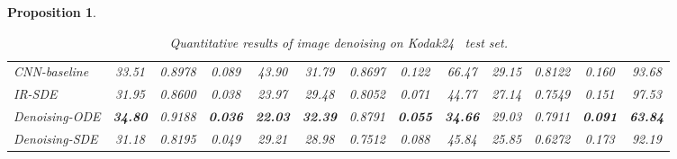 \documentclass{article}
\theoremstyle{plain}
\newtheorem{proposition}[theorem]{Proposition}
\theoremstyle{definition}
\theoremstyle{remark}
\begin{document}
\begin{proposition}
\begin{table}[ht]
\begin{minipage}[h]{1.\linewidth}
\begin{center}
\begin{small}
\begin{sc}
{\begin{tabular}{lcccccccccccc}
CNN-baseline  & 33.51 & 0.8978 & 0.089 & 43.90 & 31.79 & 0.8697 & 0.122 & 66.47 & 29.15 & 0.8122 & 0.160 & 93.68 \\

IR-SDE & 31.95 & 0.8600 & 0.038 & 23.97 & 29.48 & 0.8052 & 0.071 & 44.77 & 27.14 & 0.7549 & 0.151 & 97.53 \\

Denoising-ODE  & \textbf{34.80} & 0.9188 & \textbf{0.036} & \textbf{22.03} & \textbf{32.39} & 0.8791 & \textbf{0.055} & \textbf{34.66} & 29.03 & 0.7911 & \textbf{0.091} & \textbf{63.84} \\
Denoising-SDE  & 31.18 & 0.8195 & 0.049 & 29.21 & 28.98 & 0.7512 & 0.088 & 45.84 & 25.85 & 0.6272 & 0.173 & 92.19 \\


\bottomrule
\end{tabular}
}
\end{sc}
\end{small}
\end{center}
\vskip -0.1in
\end{minipage}

\begin{minipage}[h]{1.\linewidth}
\caption{Quantitative results of image denoising on Kodak24~\cite{franzen1999kodak} test set.}
\label{app-table:denoising_kodak24}
\begin{center}
\begin{small}
\begin{sc}
\end{sc}
\end{small}
\end{center}
\end{minipage}
\end{table}
\end{proposition}
\end{document}
